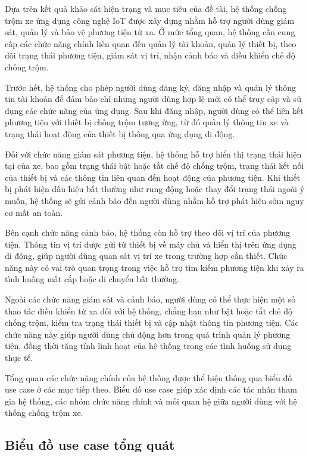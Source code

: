 \documentclass[../DoAn.tex]{subfiles}
\begin{document}
Dựa trên kết quả khảo sát hiện trạng và mục tiêu của đề tài, hệ thống chống trộm xe ứng dụng công nghệ IoT được xây dựng nhằm hỗ trợ người dùng giám sát, quản lý và bảo vệ phương tiện từ xa. Ở mức tổng quan, hệ thống cần cung cấp các chức năng chính liên quan đến quản lý tài khoản, quản lý thiết bị, theo dõi trạng thái phương tiện, giám sát vị trí, nhận cảnh báo và điều khiển chế độ chống trộm.

Trước hết, hệ thống cho phép người dùng đăng ký, đăng nhập và quản lý thông tin tài khoản để đảm bảo chỉ những người dùng hợp lệ mới có thể truy cập và sử dụng các chức năng của ứng dụng. Sau khi đăng nhập, người dùng có thể liên kết phương tiện với thiết bị chống trộm tương ứng, từ đó quản lý thông tin xe và trạng thái hoạt động của thiết bị thông qua ứng dụng di động.

Đối với chức năng giám sát phương tiện, hệ thống hỗ trợ hiển thị trạng thái hiện tại của xe, bao gồm trạng thái bật hoặc tắt chế độ chống trộm, trạng thái kết nối của thiết bị và các thông tin liên quan đến hoạt động của phương tiện. Khi thiết bị phát hiện dấu hiệu bất thường như rung động hoặc thay đổi trạng thái ngoài ý muốn, hệ thống sẽ gửi cảnh báo đến người dùng nhằm hỗ trợ phát hiện sớm nguy cơ mất an toàn.

Bên cạnh chức năng cảnh báo, hệ thống còn hỗ trợ theo dõi vị trí của phương tiện. Thông tin vị trí được gửi từ thiết bị về máy chủ và hiển thị trên ứng dụng di động, giúp người dùng quan sát vị trí xe trong trường hợp cần thiết. Chức năng này có vai trò quan trọng trong việc hỗ trợ tìm kiếm phương tiện khi xảy ra tình huống mất cắp hoặc di chuyển bất thường.

Ngoài các chức năng giám sát và cảnh báo, người dùng có thể thực hiện một số thao tác điều khiển từ xa đối với hệ thống, chẳng hạn như bật hoặc tắt chế độ chống trộm, kiểm tra trạng thái thiết bị và cập nhật thông tin phương tiện. Các chức năng này giúp người dùng chủ động hơn trong quá trình quản lý phương tiện, đồng thời tăng tính linh hoạt của hệ thống trong các tình huống sử dụng thực tế.

Tổng quan các chức năng chính của hệ thống được thể hiện thông qua biểu đồ use case ở các mục tiếp theo. Biểu đồ use case giúp xác định các tác nhân tham gia hệ thống, các nhóm chức năng chính và mối quan hệ giữa người dùng với hệ thống chống trộm xe.


\subsection{Biểu đồ use case tổng quát}
\label{subsection:2.2.1}
\end{document}
